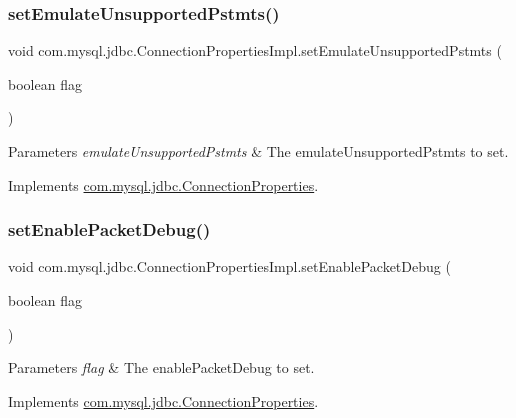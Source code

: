 \subsubsection{\texorpdfstring{set\+Emulate\+Unsupported\+Pstmts()}{setEmulateUnsupportedPstmts()}}
{\footnotesize\ttfamily void com.\+mysql.\+jdbc.\+Connection\+Properties\+Impl.\+set\+Emulate\+Unsupported\+Pstmts (\begin{DoxyParamCaption}\item[{boolean}]{flag }\end{DoxyParamCaption})}


\begin{DoxyParams}{Parameters}
{\em emulate\+Unsupported\+Pstmts} & The emulate\+Unsupported\+Pstmts to set. \\
\hline
\end{DoxyParams}


Implements \mbox{\hyperlink{interfacecom_1_1mysql_1_1jdbc_1_1_connection_properties_ad1ece011a4fffaed971f9849aa966183}{com.\+mysql.\+jdbc.\+Connection\+Properties}}.

\mbox{\label{classcom_1_1mysql_1_1jdbc_1_1_connection_properties_impl_a0ae3082906adfaa1abbc22bfb8ca865f}} 
\subsubsection{\texorpdfstring{set\+Enable\+Packet\+Debug()}{setEnablePacketDebug()}}
{\footnotesize\ttfamily void com.\+mysql.\+jdbc.\+Connection\+Properties\+Impl.\+set\+Enable\+Packet\+Debug (\begin{DoxyParamCaption}\item[{boolean}]{flag }\end{DoxyParamCaption})}


\begin{DoxyParams}{Parameters}
{\em flag} & The enable\+Packet\+Debug to set. \\
\hline
\end{DoxyParams}


Implements \mbox{\hyperlink{interfacecom_1_1mysql_1_1jdbc_1_1_connection_properties_a544989b319bc9a8c941c8c969011fcb5}{com.\+mysql.\+jdbc.\+Connection\+Properties}}.

